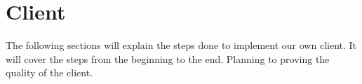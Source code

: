\section{Client}
The following sections will explain the steps done to implement our own client. It will cover the steps from the beginning to the end. Planning to proving the quality of the client.




